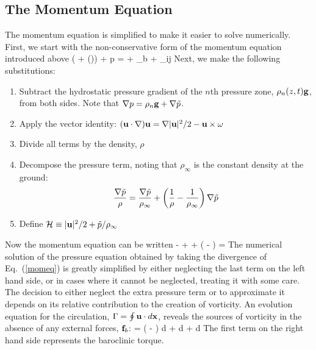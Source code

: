 \documentclass[11pt]{book}
\begin{document}
\subsection{The Momentum Equation}
\label{sec_momeqn}

The momentum equation is simplified to make it easier to solve
numerically. First, we start with the non-conservative form of the momentum equation introduced above
\be \rho \left(  + (\bu \cdot \nabla)\bu  \right) + \nabla p = \rho \bg + \bof_b + \nabla \cdot \btau_{ij}  \ee
Next, we make the following substitutions:
\begin{enumerate}
\item Subtract the hydrostatic pressure gradient of the $n$th pressure zone, $\rho_n(z,t) {\bf g}$, from both sides. Note that
$\nabla p=\rho_n {\bf g} + \nabla \tilde{p}$.
\item Apply the vector identity: $({\bf u} \cdot \nabla) {\bf u} = \nabla|{\bf u}|^2/2 - {\bf u}\times{\bf \omega} $
\item Divide all terms by the density, $\rho$
\item Decompose the pressure term, noting that $\rho_\infty$ is the constant density at the ground:
   $$ \frac{\nabla \tilde{p}}{\rho} = \frac{\nabla \tilde{p}}{\rho_\infty} + \left( \frac{1}{\rho} -
   \frac{1}{\rho_\infty} \right) \nabla \tilde{p}  $$
\item Define ${\cal H} \equiv |{\bf u}|^2/2 + \tilde{p}/\rho_\infty $
\end{enumerate}
Now the momentum equation can be written
\be {} - \bu\times\bo +  + \left(  -
    \right) \nabla \tp =    \label{momeq} \ee
The numerical solution of the pressure equation obtained by taking the divergence of Eq.~(\ref{momeq})
is greatly simplified by either neglecting the last term on the left hand side, or
in cases where it cannot be neglected, treating it with some care.
The decision to either neglect the extra pressure term or to approximate it depends on its
relative contribution to the creation of vorticity. An evolution equation for the circulation, $\Gamma=\oint {\bf u} \cdot d{\bf x}$, reveals the
sources of vorticity in the absence of any external forces, ${\bf f}_b$:
\be {} =
    \oint \left( -  \right) \nabla \tp \cdot d\bx
  + \oint {} \bg \cdot d\bx
  + \oint {}  \cdot d\bx \ee
The first term on the right hand side represents the baroclinic torque.
\end{document}
